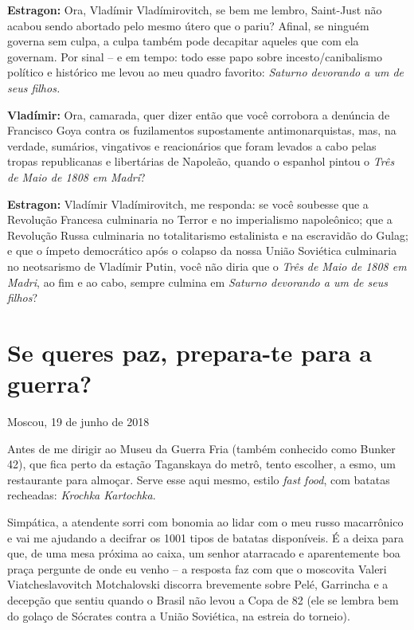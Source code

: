 \textbf{Estragon:} Ora, Vladímir Vladímirovitch, se bem me lembro,
Saint-Just não acabou sendo abortado pelo mesmo útero que o pariu?
Afinal, se ninguém governa sem culpa, a culpa também pode decapitar
aqueles que com ela governam. Por sinal -- e em tempo: todo esse papo
sobre incesto/canibalismo político e histórico me levou ao meu quadro
favorito: \emph{Saturno devorando a um de seus filhos.}

\textbf{Vladímir:} Ora, camarada, quer dizer então que você corrobora a
denúncia de Francisco Goya contra os fuzilamentos supostamente
antimonarquistas, mas, na verdade, sumários, vingativos e reacionários
que foram levados a cabo pelas tropas republicanas e libertárias de
Napoleão, quando o espanhol pintou o \emph{Três de Maio de 1808 em
Madri}?

\textbf{Estragon:} Vladímir Vladímirovitch, me responda: se você
soubesse que a Revolução Francesa culminaria no Terror e no imperialismo
napoleônico; que a Revolução Russa culminaria no totalitarismo
estalinista e na escravidão do Gulag; e que o ímpeto democrático após o
colapso da nossa União Soviética culminaria no neotsarismo de Vladímir
Putin, você não diria que o \emph{Três de Maio de 1808 em Madri}, ao fim
e ao cabo, sempre culmina em \emph{Saturno devorando a um de seus
filhos}?

\chapter*{Se queres paz, prepara-te para a guerra?}

\begin{flushright}
Moscou, 19 de junho de 2018
\end{flushright}

Antes de me dirigir ao Museu da Guerra Fria (também conhecido como
Bunker 42), que fica perto da estação Taganskaya do metrô, tento
escolher, a esmo, um restaurante para almoçar. Serve esse aqui mesmo,
estilo \emph{fast food}, com batatas recheadas: \emph{Krochka
Kartochka}.

Simpática, a atendente sorri com bonomia ao lidar com o meu russo
macarrônico e vai me ajudando a decifrar os 1001 tipos de batatas
disponíveis. É a deixa para que, de uma mesa próxima ao caixa, um senhor
atarracado e aparentemente boa praça pergunte de onde eu venho -- a
resposta faz com que o moscovita Valeri Viatcheslavovitch Motchalovski
discorra brevemente sobre Pelé, Garrincha e a decepção que sentiu quando
o Brasil não levou a Copa de 82 (ele se lembra bem do golaço de Sócrates
contra a União Soviética, na estreia do torneio).

